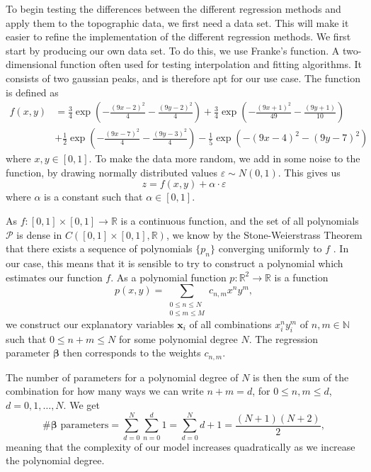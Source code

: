 \documentclass{article}
\begin{document}
To begin testing the differences between the different regression methods and apply them to the topographic data, we first need a data set. This will make it easier to refine the implementation of the different regression methods. We first start by producing our own data set. To do this, we use Franke's function. A two-dimensional function often used for testing interpolation and fitting algorithms. It consists of two gaussian peaks, and is therefore apt for our use case. The function is defined as 
\begin{equation*}
    \begin{split}
        f(x,y) & = \frac{3}{4}\exp\left(-\frac{(9x-2)^2}{4} - \frac{(9y-2)^2}{4}\right) + \frac{3}{4}\exp\left(-\frac{(9x+1)^2}{49} - \frac{(9y+1)}{10}\right) \\
        & + \frac{1}{2}\exp\left(-\frac{(9x-7)^2}{4} - \frac{(9y-3)^2}{4}\right) - \frac{1}{5}\exp\left(-(9x-4)^2 - (9y-7)^2\right)
    \end{split}
\end{equation*}
where $x,y \in [0,1]$. To make the data more random, we add in some noise to the function, by drawing normally distributed values $\varepsilon \sim N(0,1)$. This gives us
\begin{equation*}
    z = f(x,y) + \alpha \cdot \varepsilon
\end{equation*}
where $\alpha$ is a constant such that $\alpha \in [0,1]$.

As $f: [0,1] \times [0, 1] \to \mathbb{R}$ is a continuous function, and the set of all polynomials $\mathcal{P}$ is dense in $C([0,1] \times [0,1], \mathbb{R})$, we know by the Stone-Weierstrass Theorem that there exists a sequence of polynomials $\{p_n\}$ converging uniformly to $f$ \cite[p.~116--129]{lindstrom2017spaces}. In our case, this means that it is sensible to try to construct a polynomial which estimates our function $f$. As a polynomial function $p: \mathbb{R}^2 \to \mathbb{R}$ is a function
\begin{equation*}
    p(x,y) = \sum_{\substack{0 \leq n \leq N \\ 0 \leq m \leq M}} c_{n,m} x^n y^m,
\end{equation*}
we construct our explanatory variables $\boldsymbol{x}_i$ of all combinations $x_i^n y_i^m$ of $n,m \in \mathbb{N}$ such that $0 \leq n + m \leq N$ for some polynomial degree $N$. The regression parameter $\boldsymbol{\beta}$ then corresponds to the weights $c_{n,m}$.

The number of parameters for a polynomial degree of $N$ is then the sum of the combination for how many ways we can write $n+m = d$, for $0\leq n,m \leq d$, $d = 0, 1, \ldots, N$. We get
\begin{equation*}
    \text{\# $\boldsymbol{\beta}$ parameters} = \sum_{d = 0}^N \sum_{n = 0}^d 1
    = \sum_{d = 0}^N d + 1
    = \frac{(N + 1)(N + 2)}{2},
\end{equation*}
meaning that the complexity of our model increases quadratically as we increase the polynomial degree.
\end{document}
